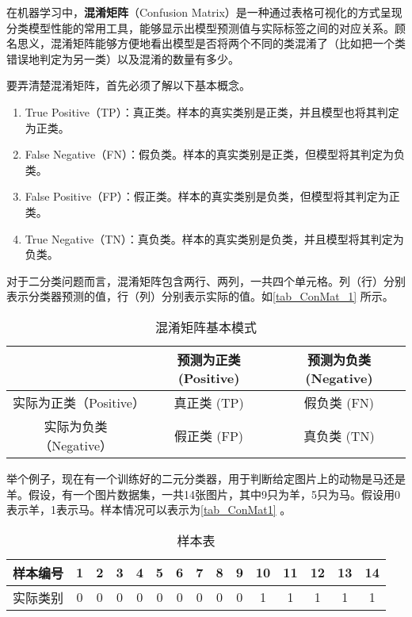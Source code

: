 

在机器学习中，\textbf{混淆矩阵}（Confusion Matrix）是一种通过表格可视化的方式呈现分类模型性能的常用工具，能够显示出模型预测值与实际标签之间的对应关系。顾名思义，混淆矩阵能够方便地看出模型是否将两个不同的类混淆了（比如把一个类错误地判定为另一类）以及混淆的数量有多少。

要弄清楚混淆矩阵，首先必须了解以下基本概念。

\begin{enumerate}
\item True Positive（TP）：真正类。样本的真实类别是正类，并且模型也将其判定为正类。
\item False Negative（FN）：假负类。样本的真实类别是正类，但模型将其判定为负类。
\item False Positive（FP）：假正类。样本的真实类别是负类，但模型将其判定为正类。
\item True Negative（TN）：真负类。样本的真实类别是负类，并且模型将其判定为负类。 
\end{enumerate}

对于二分类问题而言，混淆矩阵包含两行、两列，一共四个单元格。列（行）分别表示分类器预测的值，行（列）分别表示实际的值。如\autoref{tab_ConMat_1} 所示。

\begin{table}[ht]
\centering
\caption{混淆矩阵基本模式}\label{tab_ConMat_1}
\begin{tabular}{|c|c|c|}
\hline
 & 预测为正类 (Positive)& 预测为负类 (Negative)\\
\hline
实际为正类（Positive） & 真正类 (TP)& 假负类 (FN) \\
\hline
实际为负类 （Negative）& 假正类 (FP) & 真负类 (TN)\\
\hline
\end{tabular}
\end{table}

举个例子，现在有一个训练好的二元分类器，用于判断给定图片上的动物是马还是羊。假设，有一个图片数据集，一共14张图片，其中9只为羊，5只为马。假设用0表示羊，1表示马。样本情况可以表示为\autoref{tab_ConMat1} 。

\begin{table}[ht]
\centering
\caption{样本表}\label{tab_ConMat1}
\begin{tabular}{|c|c|c|c|c|c|c|c|c|c|c|c|c|c|c|}
\hline
样本编号 & 1 & 2 & 3 & 4 & 5 & 6 & 7 & 8 & 9 & 10 & 11 & 12 & 13 & 14 \\
\hline
实际类别 & 0 & 0 & 0 & 0 & 0 & 0 & 0 & 0 & 0 & 1 & 1 & 1 & 1 & 1 \\
\hline
\end{tabular}
\end{table}

